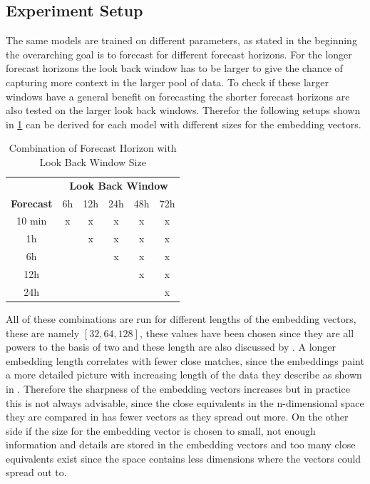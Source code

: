 \documentclass{article}
\begin{document}
\subsection{Experiment Setup}

The same models are trained on different parameters, as stated in the beginning the overarching goal is to forecast for different forecast horizons. For the longer forecast horizons the look back window has to be larger to give the chance of capturing more context in the larger pool of data. To check if these larger windows have a general benefit on forecasting the shorter forecast horizons are also tested on the larger look back windows. Therefor the following setups shown in \ref{tab:forecast-lookback} can be derived for each model with different sizes for the embedding vectors. 

\begin{table}[h!]
  \begin{center}
    \begin{tabular}{c|c|c|c|c|c}
      \toprule %
       & \multicolumn{5}{c}{\textbf{Look Back Window}} \\
      \textbf{Forecast} & 6h & 12h & 24h & 48h & 72h \\
      \midrule %
      10 min & x & x & x & x & x \\
      1h &  & x & x & x & x \\
      6h &  &  & x & x & x \\
      12h &  &  &  & x & x \\
      24h &  &  &  &  & x \\
      \bottomrule %
    \end{tabular}
    \caption{Combination of Forecast Horizon with Look Back Window Size}
    \label{tab:forecast-lookback}
  \end{center}
\end{table}

All of these combinations are run for different lengths of the embedding vectors, these are namely $[32, 64, 128]$, these values have been chosen since they are all powers to the basis of two and these length are also discussed by \cite{optimal_embedding_length}. A longer embedding length correlates with fewer close matches, since the embeddings paint a more detailed picture with increasing length of the data they describe as shown in \cite{introduction_embeddings}. Therefore the sharpness of the embedding vectors increases but in practice this is not always advisable, since the close equivalents in the n-dimensional space they are compared in has fewer vectors as they spread out more. On the other side if the size for the embedding vector is chosen to small, not enough information and details are stored in the embedding vectors and too many close equivalents exist since the space contains less dimensions where the vectors could spread out to.
\end{document}
